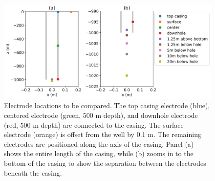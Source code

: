 \begin{figure}
    \begin{center}
    \includegraphics[width=\textwidth]{figures/dc_casing/electrode_location.png}
    \end{center}
\caption{
    Electrode locations to be compared. The top casing electrode (blue),
    centered electrode (green, 500 m depth), and downhole electrode (red, 500 m depth)
    are connected to the casing. The surface electrode (orange) is offset from the well
    by 0.1 m. The remaining electrodes are positioned along the axis of the casing. Panel (a)
    shows the entire length of the casing, while (b) zooms in to the bottom of the casing
    to show the separation between the electrodes beneath the casing.
}
\label{fig:electrode_location}
\end{figure}
